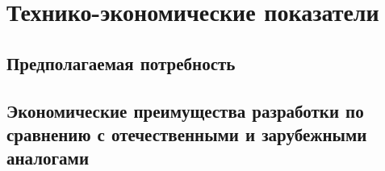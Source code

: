 \section{Технико-экономические показатели}

\subsection{Предполагаемая потребность}


\subsection{Экономические преимущества разработки по сравнению с отечественными и зарубежными аналогами}

